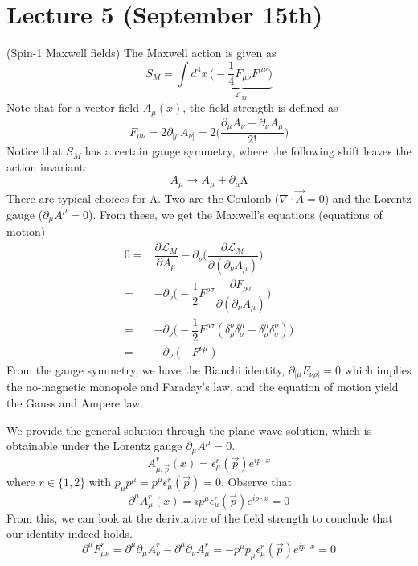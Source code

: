 \section{Lecture 5 (September 15th)}
\begin{defi}
(Spin-1 Maxwell fields) The Maxwell action is given as
\[S_{M}=\int d^{4}x\,\underbrace{\Big(-\dfrac{1}{4}F_{\mu \nu }F^{\mu \nu }\Big)}_{\mathcal{L}_{M}}\]
Note that for a vector field $A_{\mu }(x)$, the field strength is defined as
\[F_{\mu \nu }=2\partial _{[\mu }A_{\nu ]}=2\Big(\dfrac{\partial _{\mu }A_{\nu }-\partial _{\nu }A_{\mu }}{2!}\Big)\]
Notice that $S_{M}$ has a certain gauge symmetry, where the following shift leaves the action invariant:
\[A_{\mu }\rightarrow A_{\mu }+\partial _{\mu }\mathrm{\Lambda }\]
There are typical choices for $\mathrm{\Lambda }$. Two are the Coulomb ($\nabla \cdot \vec{A}=0$) and the Lorentz gauge ($\partial _{\mu }A^{\mu }=0$). From these, we get the Maxwell's equations (equations of motion)
\[\begin{align*}
	0=&\dfrac{\partial \mathcal{L}_{M}}{\partial A_{\mu }}-\partial _{\nu }\Big(\dfrac{\partial \mathcal{L_{M}}}{\partial (\partial _{\nu }A_{\mu })} \Big) \\
=&-\partial_{\nu }\Big( -\dfrac{1}{2}F^{\rho \sigma }	\dfrac{\partial F_{\rho \sigma }}{\partial (\partial _{\nu }A_{\mu })}\Big)\\
=&-\partial _{\nu }\Big(-\dfrac{1}{2}F^{\rho \sigma }(\delta ^{\nu }_{\rho }\delta ^{\mu }_{\sigma }-\delta^{\mu }_{\rho }\delta ^{\nu }_{\sigma  })\Big)\\
=&-\partial _{\nu }(-F^{\nu \mu })
\end{align*}\]
From the gauge symmetry, we have the Bianchi identity, $\partial _{[\mu }F_{\nu \rho ]}=0$ which implies the no-magnetic monopole and Faraday's law, and the equation of motion yield the Gauss and Ampere law.
\end{defi}
\vspace{2ex}
\begin{prop}
We provide the general solution through the plane wave solution, which is obtainable under the Lorentz gauge $\partial _{\mu }A^{\mu }=0$.
\[A^{r}_{\mu,\vec{p}}(x)=\epsilon ^{r}_{\mu }(\vec{p})e^{ip\cdot x}\]
where $r\in \{1,2\}$ with $p_{\mu }p^{\mu }=p^{\mu }\epsilon ^{r}_{\mu }(\vec{p})=0$. Observe that 
\[\partial ^{\mu }A^{r}_{\mu }(x)=ip^{\mu }\epsilon^{r}_{\mu }(\vec{p})e^{ip\cdot x}=0 \]
From this, we can look at the deriviative of the field strength to conclude that our identity indeed holds.
\[\partial ^{\mu }F_{\mu \nu }^{r}=\partial ^{\mu }\partial _{\mu }A^{r}_{\nu }-\partial ^{\mu }\partial _{\nu }A^{r}_{\mu }=-p^{\mu }p_{\mu }\epsilon ^{r}_{\mu }(\vec{p})e^{ip\cdot x}=0\]
\end{prop}
